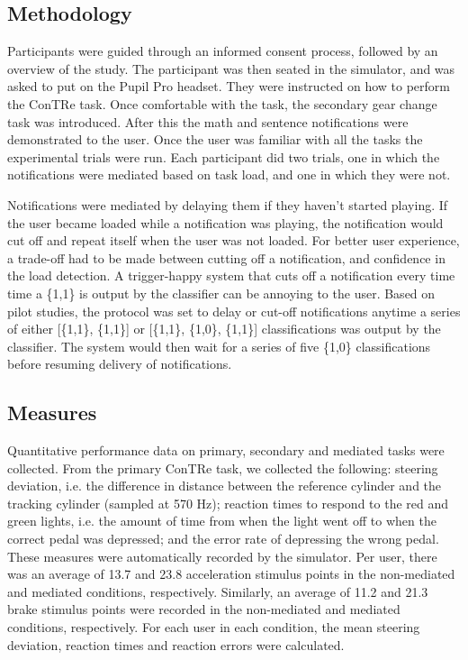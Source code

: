 \subsection{Methodology}
Participants were guided through an informed consent process, followed by an overview of the study. The participant was then seated in the simulator, and was asked to put on the Pupil Pro headset. They were instructed on how to perform the ConTRe task. Once comfortable with the task, the secondary gear change task was introduced. After this the math and sentence notifications were demonstrated to the user. Once the user was familiar with all the tasks the experimental trials were run. Each participant did two trials, one in which the notifications were mediated based on task load, and one in which they were not. 

Notifications were mediated by delaying them if they haven't started playing. If the user became loaded while a notification was playing, the notification would cut off and repeat itself when the user was not loaded. For better user experience, a trade-off had to be made between cutting off a notification, and confidence in the load detection. A trigger-happy system that cuts off a notification every time time a \{1,1\} is output by the classifier can be annoying to the user. Based on pilot studies, the protocol was set to delay or cut-off notifications anytime a series of either [\{1,1\}, \{1,1\}] or [\{1,1\}, \{1,0\}, \{1,1\}] classifications was output by the classifier. The system would then wait for a series of five \{1,0\} classifications before resuming delivery of notifications.  

\subsection{Measures}
Quantitative performance data on primary, secondary and mediated tasks were collected. From the primary ConTRe task, we collected the following: steering deviation, i.e. the difference in distance between the reference cylinder and the tracking cylinder (sampled at 570 Hz); reaction times to respond to the red and green lights, i.e. the amount of time from when the light went off to when the correct pedal was depressed; and the error rate of depressing the wrong pedal. These measures were automatically recorded by the simulator. Per user, there was an average of 13.7 and 23.8 acceleration stimulus points in the non-mediated and mediated conditions, respectively. Similarly, an average of 11.2 and 21.3 brake stimulus points were recorded in the non-mediated and mediated conditions, respectively. For each user in each condition, the mean steering deviation, reaction times and reaction errors were calculated.  

